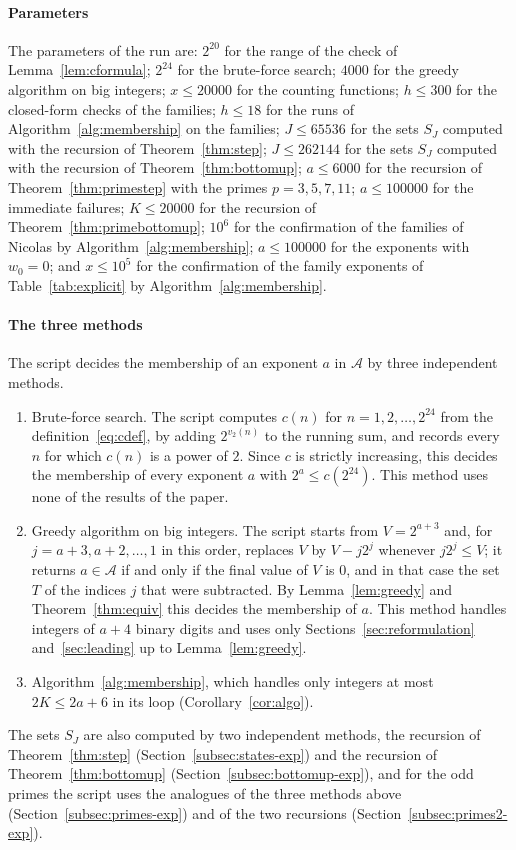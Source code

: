 \documentclass[11pt]{amsart}
\theoremstyle{definition}
\begin{document}
\paragraph{Parameters} The parameters of the run are: $2^{20}$ for the range of the check of Lemma~\ref{lem:cformula}; $2^{24}$ for the brute-force search; $4000$ for the greedy algorithm on big integers; $x\le20000$ for the counting functions; $h\le300$ for the closed-form checks of the families; $h\le18$ for the runs of Algorithm~\ref{alg:membership} on the families; $J\le65536$ for the sets $S_J$ computed with the recursion of Theorem~\ref{thm:step}; $J\le262144$ for the sets $S_J$ computed with the recursion of Theorem~\ref{thm:bottomup}; $a\le6000$ for the recursion of Theorem~\ref{thm:primestep} with the primes $p=3,5,7,11$; $a\le100000$ for the immediate failures; $K\le20000$ for the recursion of Theorem~\ref{thm:primebottomup}; $10^6$ for the confirmation of the families of Nicolas by Algorithm~\ref{alg:membership}; $a\le100000$ for the exponents with $w_0=0$; and $x\le10^5$ for the confirmation of the family exponents of Table~\ref{tab:explicit} by Algorithm~\ref{alg:membership}.

\paragraph{The three methods} The script decides the membership of an exponent $a$ in $\mathcal{A}$ by three independent methods.
\begin{enumerate}
\item Brute-force search. The script computes $c(n)$ for $n=1,2,\dots,2^{24}$ from the definition~\eqref{eq:cdef}, by adding $2^{v_2(n)}$ to the running sum, and records every $n$ for which $c(n)$ is a power of $2$. Since $c$ is strictly increasing, this decides the membership of every exponent $a$ with $2^a\le c(2^{24})$. This method uses none of the results of the paper.
\item Greedy algorithm on big integers. The script starts from $V=2^{a+3}$ and, for $j=a+3,a+2,\dots,1$ in this order, replaces $V$ by $V-j2^j$ whenever $j2^j\le V$; it returns $a\in\mathcal{A}$ if and only if the final value of $V$ is $0$, and in that case the set $T$ of the indices $j$ that were subtracted. By Lemma~\ref{lem:greedy} and Theorem~\ref{thm:equiv} this decides the membership of $a$. This method handles integers of $a+4$ binary digits and uses only Sections~\ref{sec:reformulation} and~\ref{sec:leading} up to Lemma~\ref{lem:greedy}.
\item Algorithm~\ref{alg:membership}, which handles only integers at most $2K\le2a+6$ in its loop (Corollary~\ref{cor:algo}).
\end{enumerate}
The sets $S_J$ are also computed by two independent methods, the recursion of Theorem~\ref{thm:step} (Section~\ref{subsec:states-exp}) and the recursion of Theorem~\ref{thm:bottomup} (Section~\ref{subsec:bottomup-exp}), and for the odd primes the script uses the analogues of the three methods above (Section~\ref{subsec:primes-exp}) and of the two recursions (Section~\ref{subsec:primes2-exp}).
\end{document}
